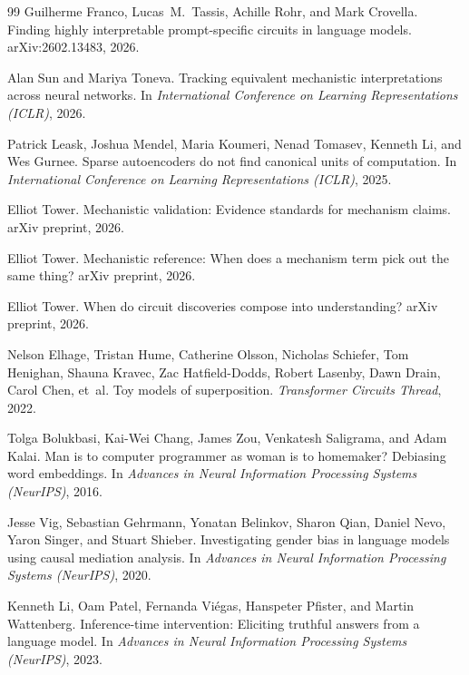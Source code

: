 \documentclass{article}
\begin{document}
\begin{thebibliography}{99}
Guilherme Franco, Lucas~M.\ Tassis, Achille Rohr, and Mark Crovella.
\newblock Finding highly interpretable prompt-specific circuits in language
  models.
\newblock arXiv:2602.13483, 2026.

Alan Sun and Mariya Toneva.
\newblock Tracking equivalent mechanistic interpretations across neural
  networks.
\newblock In \emph{International Conference on Learning Representations
  (ICLR)}, 2026.

Patrick Leask, Joshua Mendel, Maria Koumeri, Nenad Tomasev, Kenneth Li, and
  Wes Gurnee.
\newblock Sparse autoencoders do not find canonical units of computation.
\newblock In \emph{International Conference on Learning Representations
  (ICLR)}, 2025.

Elliot Tower.
\newblock Mechanistic validation: Evidence standards for mechanism claims.
\newblock arXiv preprint, 2026.

Elliot Tower.
\newblock Mechanistic reference: When does a mechanism term pick out the same
  thing?
\newblock arXiv preprint, 2026.

Elliot Tower.
\newblock When do circuit discoveries compose into understanding?
\newblock arXiv preprint, 2026.

Nelson Elhage, Tristan Hume, Catherine Olsson, Nicholas Schiefer, Tom Henighan,
  Shauna Kravec, Zac Hatfield-Dodds, Robert Lasenby, Dawn Drain, Carol Chen,
  et~al.
\newblock Toy models of superposition.
\newblock \emph{Transformer Circuits Thread}, 2022.

Tolga Bolukbasi, Kai-Wei Chang, James Zou, Venkatesh Saligrama, and Adam Kalai.
\newblock Man is to computer programmer as woman is to homemaker? Debiasing word
  embeddings.
\newblock In \emph{Advances in Neural Information Processing Systems (NeurIPS)}, 2016.

Jesse Vig, Sebastian Gehrmann, Yonatan Belinkov, Sharon Qian, Daniel Nevo,
  Yaron Singer, and Stuart Shieber.
\newblock Investigating gender bias in language models using causal mediation
  analysis.
\newblock In \emph{Advances in Neural Information Processing Systems (NeurIPS)}, 2020.

Kenneth Li, Oam Patel, Fernanda Vi\'{e}gas, Hanspeter Pfister, and Martin Wattenberg.
\newblock Inference-time intervention: Eliciting truthful answers from a
  language model.
\newblock In \emph{Advances in Neural Information Processing Systems (NeurIPS)}, 2023.


\end{thebibliography}
\end{document}
